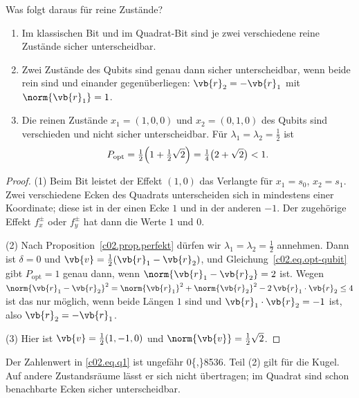 Was folgt daraus für reine Zustände?

\begin{corollary}\label{c02.cor.rein}
  \begin{enumerate}
    \item Im klassischen Bit und im Quadrat-Bit sind je zwei verschiedene reine Zustände
      sicher unterscheidbar.
    \item Zwei Zustände des Qubits sind genau dann sicher unterscheidbar, wenn beide rein
      sind und einander gegenüberliegen: $\vb{r}_2 = -\vb{r}_1$ mit $\norm{\vb{r}_1} = 1$.
    \item Die reinen Zustände $x_1 = (1,0,0)$ und $x_2 = (0,1,0)$ des Qubits sind
      verschieden und nicht sicher unterscheidbar. Für $\lambda_1 = \lambda_2 = \tfrac12$
      ist
      \begin{equation}\label{c02.eq.q1}
        P_{\mathrm{opt}} = \tfrac12\Bigl(1 + \tfrac12\sqrt{2}\Bigr) = \tfrac14\bigl(2 + \sqrt{2}\bigr) < 1 .
      \end{equation}
  \end{enumerate}
\end{corollary}
\begin{proof}
  (1) Beim Bit leistet der Effekt $(1,0)$ das Verlangte für $x_1 = s_0$, $x_2 = s_1$. Zwei
  verschiedene Ecken des Quadrats unterscheiden sich in mindestens einer Koordinate; diese
  ist in der einen Ecke $1$ und in der anderen $-1$. Der zugehörige Effekt $f_x^{\pm}$ oder
  $f_y^{\pm}$ hat dann die Werte $1$ und $0$.

  (2) Nach Proposition~\ref{c02.prop.perfekt} dürfen wir $\lambda_1 = \lambda_2 = \tfrac12$
  annehmen. Dann ist $\delta = 0$ und $\vb{v} = \tfrac12(\vb{r}_1 - \vb{r}_2)$, und
  Gleichung~\eqref{c02.eq.opt-qubit} gibt $P_{\mathrm{opt}} = 1$ genau dann, wenn
  $\norm{\vb{r}_1 - \vb{r}_2} = 2$ ist. Wegen
  $\norm{\vb{r}_1 - \vb{r}_2}^2 = \norm{\vb{r}_1}^2 + \norm{\vb{r}_2}^2 - 2\,\vb{r}_1\cdot\vb{r}_2 \leq 4$
  ist das nur möglich, wenn beide Längen $1$ sind und $\vb{r}_1\cdot\vb{r}_2 = -1$ ist,
  also $\vb{r}_2 = -\vb{r}_1$.

  (3) Hier ist $\vb{v} = \tfrac12(1, -1, 0)$ und $\norm{\vb{v}} = \tfrac12\sqrt{2}$.
\end{proof}

Der Zahlenwert in \eqref{c02.eq.q1} ist ungefähr \num[c02.cl.level-q1]{0{,}8536}{}. Teil (2)
gilt für die Kugel. Auf andere Zustandsräume lässt er sich nicht übertragen; im Quadrat sind
schon benachbarte Ecken sicher unterscheidbar.

